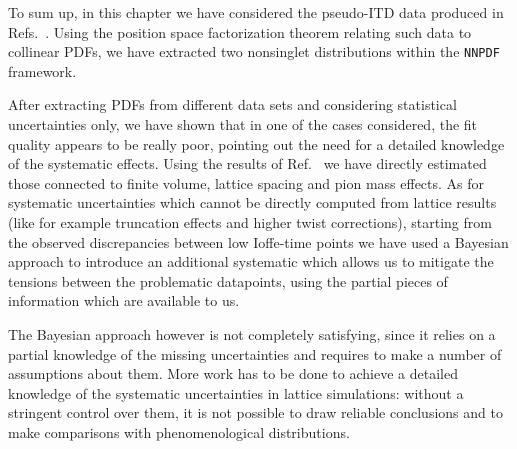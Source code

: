 To sum up, in this chapter
we have considered the pseudo-ITD data produced in Refs.~\cite{Joo:2019jct,Joo:2020spy}. Using the
position space factorization theorem relating such data to collinear PDFs, we have extracted two nonsinglet distributions 
within the {\tt NNPDF} framework. 

%
After extracting PDFs from different data sets and 
considering statistical uncertainties only, 
we have shown that in one of the cases considered, the fit quality appears to be really poor,
pointing out the need for a detailed knowledge of the systematic effects.
Using the results of Ref.~\cite{Joo:2019jct,Joo:2020spy} we have directly estimated those connected to finite volume, lattice spacing
and pion mass effects. As for systematic uncertainties which cannot be directly computed from lattice results (like
for example truncation effects and higher twist corrections), starting from
the observed discrepancies between low Ioffe-time points we have used a Bayesian approach to introduce an additional systematic 
which allows us to mitigate the tensions between the problematic datapoints, using the partial pieces of information which are available to us.

%
The Bayesian approach however is not completely satisfying, since it relies on a partial knowledge of the
missing uncertainties and requires to make a number of assumptions about them. More work has to be done
to achieve a detailed knowledge of the systematic uncertainties in lattice simulations: 
without a stringent control over them, it is not possible to draw reliable conclusions and
to make comparisons with phenomenological distributions. 

